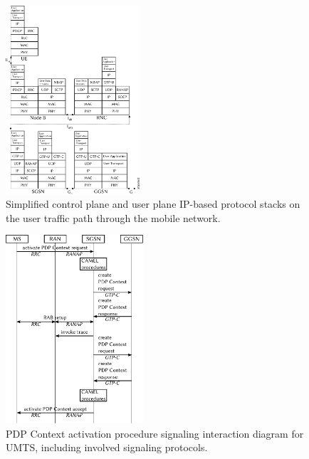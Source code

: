 \documentclass{beamer}
\begin{document}
\begin{frame}
	\begin{figure}
		\centering
		\includegraphics[height=7cm]{../../chapters/04-mobilenets/images/umts-userpath-stack.pdf}
		\caption{Simplified control plane and user plane IP-based protocol stacks on the user traffic path through the mobile network.}
	\end{figure}
\end{frame}


\begin{frame}
	\begin{figure}
		\centering
		\includegraphics[height=7cm]{../../chapters/04-mobilenets/images/pdp-context-activation-procedure.pdf}
		\caption{PDP Context activation procedure signaling interaction diagram for UMTS, including involved signaling protocols.}
	\end{figure}
\end{frame}
\end{document}
